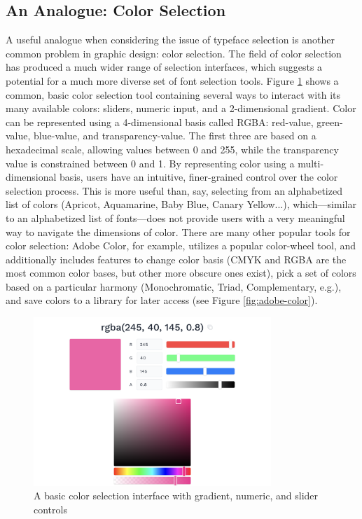 \subsection{An Analogue: Color Selection}

A useful analogue when considering the issue of typeface selection is another common problem in graphic design: color selection. The field of color selection has produced a much wider range of selection interfaces, which suggests a potential for a much more diverse set of font selection tools. Figure \ref{fig:basic-color-picker} shows a common, basic color selection tool containing several ways to interact with its many available colors: sliders, numeric input, and a 2-dimensional gradient. Color can be represented using a 4-dimensional basis called RGBA: red-value, green-value, blue-value, and transparency-value. The first three are based on a hexadecimal scale, allowing values between 0 and 255, while the transparency value is constrained between 0 and 1. By representing color using a multi-dimensional basis, users have an intuitive, finer-grained control over the color selection process. This is more useful than, say, selecting from an alphabetized list of colors (Apricot, Aquamarine, Baby Blue, Canary Yellow...), which---similar to an alphabetized list of fonts---does not provide users with a very meaningful way to navigate the dimensions of color. There are many other popular tools for color selection: Adobe Color, for example, utilizes a popular color-wheel tool, and additionally includes features to change color basis (CMYK and RGBA are the most common color bases, but other more obscure ones exist), pick a set of colors based on a particular harmony (Monochromatic, Triad, Complementary, e.g.), and save colors to a library for later access (see Figure \ref{fig:adobe-color}).

\begin{figure}[]
    \centering
    \includegraphics[width=0.8\textwidth]{images/basic-color-picker.png}
    \caption{A basic color selection interface with gradient, numeric, and slider controls}
    \label{fig:basic-color-picker}
\end{figure}

